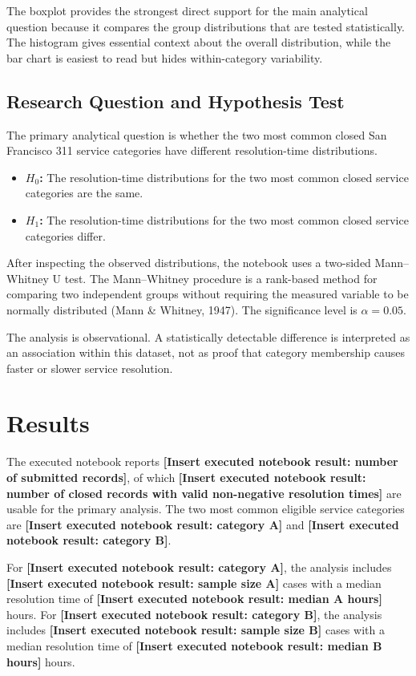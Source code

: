 \documentclass[12pt]{article}
\newcommand{\resultplaceholder}[1]{\textbf{[Insert executed notebook result: #1]}}
\begin{document}
The boxplot provides the strongest direct support for the main analytical question because it compares the group distributions that are tested statistically. The histogram gives essential context about the overall distribution, while the bar chart is easiest to read but hides within-category variability.

\subsection*{Research Question and Hypothesis Test}
The primary analytical question is whether the two most common closed San Francisco 311 service categories have different resolution-time distributions.

\begin{itemize}
\item \textbf{$H_0$:} The resolution-time distributions for the two most common closed service categories are the same.
\item \textbf{$H_1$:} The resolution-time distributions for the two most common closed service categories differ.
\end{itemize}

After inspecting the observed distributions, the notebook uses a two-sided Mann--Whitney U test. The Mann--Whitney procedure is a rank-based method for comparing two independent groups without requiring the measured variable to be normally distributed (Mann \& Whitney, 1947). The significance level is $\alpha=0.05$.

The analysis is observational. A statistically detectable difference is interpreted as an association within this dataset, not as proof that category membership causes faster or slower service resolution.

\section*{Results}
The executed notebook reports \resultplaceholder{number of submitted records}, of which \resultplaceholder{number of closed records with valid non-negative resolution times} are usable for the primary analysis. The two most common eligible service categories are \resultplaceholder{category A} and \resultplaceholder{category B}.

For \resultplaceholder{category A}, the analysis includes \resultplaceholder{sample size A} cases with a median resolution time of \resultplaceholder{median A hours} hours. For \resultplaceholder{category B}, the analysis includes \resultplaceholder{sample size B} cases with a median resolution time of \resultplaceholder{median B hours} hours.
\end{document}
